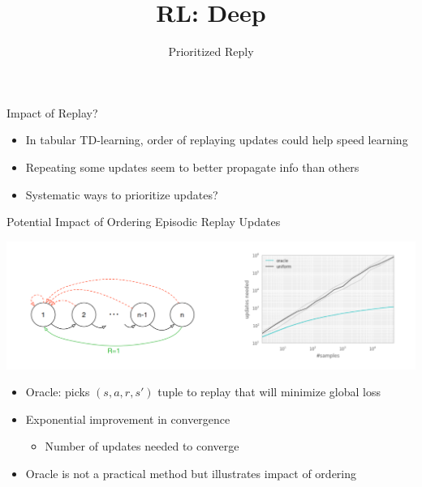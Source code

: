 


\title[Reinforcement Learning: Deep Reinforcement Learning]{RL: Deep}
\subtitle{Prioritized Reply}




	
	\maketitle

\begin{frame}[c]{Impact of Replay?}
	

\begin{itemize}
	\item In tabular TD-learning, \alert{order} of replaying updates could help speed
	learning
	\item Repeating some updates seem to better propagate info than others
	\item Systematic ways to prioritize updates?
\end{itemize}
	
\end{frame}
\begin{frame}[c]{Potential Impact of Ordering Episodic Replay Updates }
	
	\includegraphics[width=1.0\textwidth]{images/oracle_reply.png}
	
	\begin{itemize}
		\item Oracle: picks $(s, a, r , s' )$ tuple to replay that will minimize global loss
		\item Exponential improvement in convergence
		\begin{itemize}
			\item 		Number of updates needed to converge
		\end{itemize}
		\item Oracle is not a practical method but illustrates impact of ordering
	\end{itemize}
	
\end{frame}
